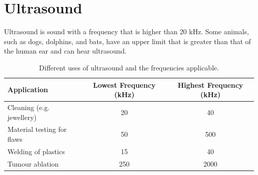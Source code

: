             \section{Ultrasound}
            \nopagebreak
      \label{m38800*id185135}Ultrasound is sound with a frequency that is higher than 20 kHz. Some animals, such as dogs, dolphins, and bats, have an upper limit that is greater than that of the human ear and can hear ultrasound.
          \begin{table}[H]
        \begin{center}
      \label{m38800*eip-558}
    \noindent
      \begin{tabular}{|l|c|c|}\hline
        Application &
        Lowest Frequency (kHz) &
        Highest Frequency (kHz) \\ \hline
        Cleaning (e.g. jewellery) &
        20 &
        40 \\ \hline
        Material testing for flaws &
        50 &
        500 \\ \hline
        Welding of plastics &
        15 &
        40 \\ \hline
        Tumour ablation &
        250 &
        2000 \\ \hline
    \end{tabular}
      \end{center}
    \caption{Different uses of ultrasound and the frequencies applicable.}
\end{table}
    \par
  \par 

